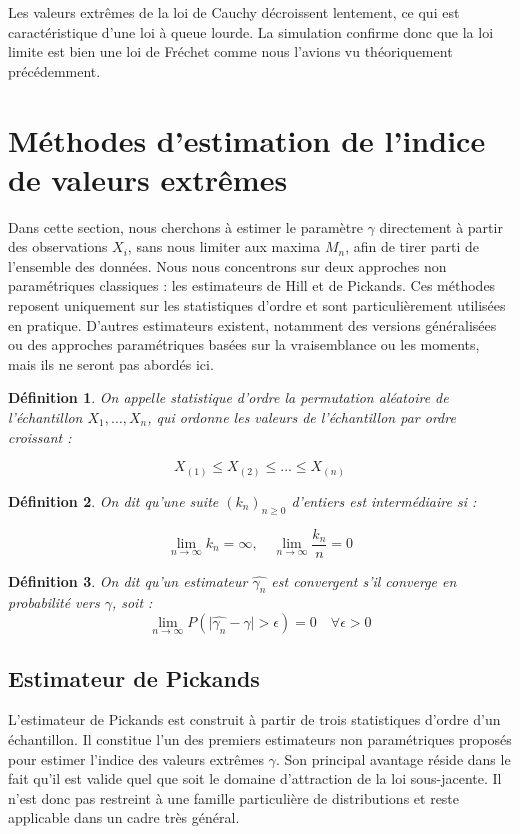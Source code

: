 \documentclass{article}
\theoremstyle{plain}
\newtheorem{definition}{Définition}[section]
\theoremstyle{definition}
\theoremstyle{plain}
\begin{document}
\noindent Les valeurs extrêmes de la loi de Cauchy décroissent lentement, ce qui est caractéristique d'une loi à queue lourde. La simulation confirme donc que la loi limite est bien une loi de Fréchet comme nous l'avions vu théoriquement précédemment.

\section{Méthodes d'estimation de l'indice de valeurs extrêmes}
\noindent Dans cette section, nous cherchons à estimer le paramètre \(\gamma\) directement à partir des observations \(X_i\), sans nous limiter aux maxima \(M_n\), afin de tirer parti de l’ensemble des données.  
Nous nous concentrons sur deux approches non paramétriques classiques : les estimateurs de Hill et de Pickands. Ces méthodes reposent uniquement sur les statistiques d’ordre et sont particulièrement utilisées en pratique. D'autres estimateurs existent, notamment des versions généralisées ou des approches paramétriques basées sur la vraisemblance ou les moments, mais ils ne seront pas abordés ici. \\

\begin{definition}
On appelle \textit{statistique d'ordre} la permutation aléatoire de l'échantillon \(X_1, \dots, X_n\), qui ordonne les valeurs de l’échantillon par ordre croissant :

\[
X_{(1)} \leq X_{(2)} \leq \dots \leq X_{(n)}
\]
\end{definition}

\begin{definition}
On dit qu'une suite \((k_n)_{n \geq 0}\) d'entiers est intermédiaire si :

\[
\lim_{n \to \infty} k_n = \infty, \quad \lim_{n \to \infty} \frac{k_n}{n} = 0
\]

\end{definition}


\begin{definition}
On dit qu'un estimateur \(\hat{\gamma_{n}}\) est convergent s'il converge en probabilité vers \(\gamma\), soit :
\[
\lim_{n \to \infty} P(\lvert \hat{\gamma_{n}} - \gamma \rvert > \epsilon) = 0 \quad \forall \epsilon > 0
\]  
\end{definition}

\subsection{Estimateur de Pickands}
L’estimateur de Pickands est construit à partir de trois statistiques d’ordre d'un échantillon. Il constitue l’un des premiers estimateurs non paramétriques proposés pour estimer l’indice des valeurs extrêmes \(\gamma\). Son principal avantage réside dans le fait qu’il est valide quel que soit le domaine d’attraction de la loi sous-jacente. Il n'est donc pas restreint à une famille particulière de distributions et reste applicable dans un cadre très général.
\end{document}
